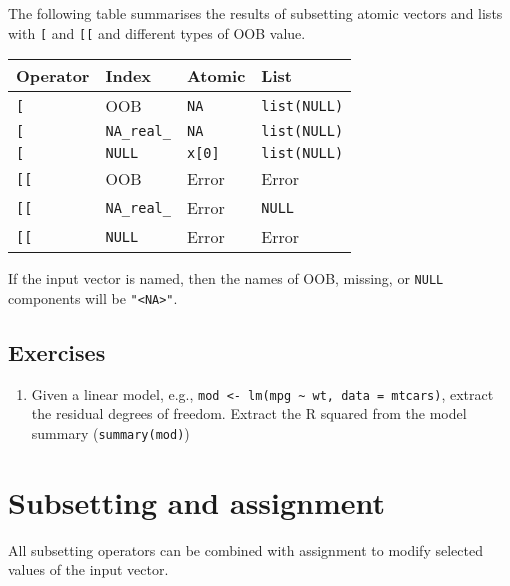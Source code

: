 The following table summarises the results of subsetting atomic vectors
and lists with \texttt{{[}} and \texttt{{[}{[}} and different types of
OOB value.

\begin{longtable}[]{@{}llll@{}}
\toprule
Operator & Index & Atomic & List\tabularnewline
\midrule
\endhead
\texttt{{[}} & OOB & \texttt{NA} & \texttt{list(NULL)}\tabularnewline
\texttt{{[}} & \texttt{NA\_real\_} & \texttt{NA} &
\texttt{list(NULL)}\tabularnewline
\texttt{{[}} & \texttt{NULL} & \texttt{x{[}0{]}} &
\texttt{list(NULL)}\tabularnewline
\texttt{{[}{[}} & OOB & Error & Error\tabularnewline
\texttt{{[}{[}} & \texttt{NA\_real\_} & Error &
\texttt{NULL}\tabularnewline
\texttt{{[}{[}} & \texttt{NULL} & Error & Error\tabularnewline
\bottomrule
\end{longtable}

If the input vector is named, then the names of OOB, missing, or
\texttt{NULL} components will be \texttt{"\textless{}NA\textgreater{}"}.

\hypertarget{exercises-1}{%
\subsection{Exercises}\label{exercises-1}}

\begin{enumerate}
\def\labelenumi{\arabic{enumi}.}
\tightlist
\item
  Given a linear model, e.g.,
  \texttt{mod\ \textless{}-\ lm(mpg\ \textasciitilde{}\ wt,\ data\ =\ mtcars)},
  extract the residual degrees of freedom. Extract the R squared from
  the model summary (\texttt{summary(mod)})
\end{enumerate}

\hypertarget{subassignment}{%
\section{Subsetting and assignment}\label{subassignment}}

All subsetting operators can be combined with assignment to modify
selected values of the input vector. 

\begin{Shaded}
\begin{Highlighting}[]
\StringTok{ }\OperatorTok{:}
\NormalTok{x[}\NormalTok{(}\NormalTok{, }\NormalTok{)] <-}\StringTok{ }\OperatorTok{:}
\end{Highlighting}
\end{Shaded}

